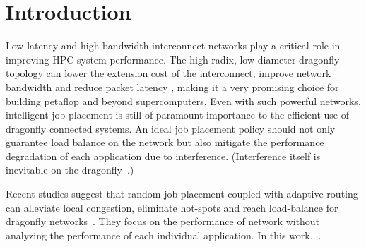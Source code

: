 \section{Introduction}
\label{sec:intro}

Low-latency and high-bandwidth interconnect networks play a critical role in improving HPC system performance. 
The high-radix, low-diameter dragonfly topology can lower the extension cost of the interconnect, improve network bandwidth and reduce packet latency \cite{dally-dragonfly}, 
making it a very promising choice for building petaflop and beyond supercomputers. 
Even with such powerful networks, 
intelligent job placement is still of paramount importance to the efficient use of dragonfly connected systems. 
An ideal job placement policy should not only guarantee load balance on the network 
but also mitigate the performance degradation of each application due to interference.  
(Interference itself is inevitable on the dragonfly~\cite{bhatele2015, dskinner}.)

Recent studies suggest that random job placement coupled with adaptive routing can alleviate local congestion, eliminate hot-spots and reach load-balance for dragonfly networks~\cite{jain-sc14, bhatele-sc11, brandt2014}. They focus on the performance of network without analyzing the performance of each individual application. In this work....





